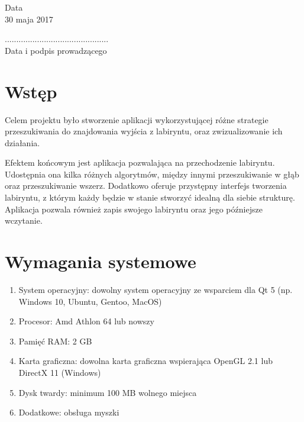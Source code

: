 \documentclass[12pt,a4paper]{article}
\newcommand{\datazajec}{30 maja 2017}
\begin{document}
	\begin{minipage}[t]{0.4\linewidth}
		\centering
		Data \\
		\small \datazajec
	\end{minipage}
	
	\begin{flushright}
		\begin{minipage}[t]{0.5\linewidth}
			\centering
			............................................. \\
			\small \textsf{Data i podpis prowadzącego}
		\end{minipage}
	\end{flushright}
	\pagebreak

	\tableofcontents

	\pagebreak

	
	\section{Wstęp}
	Celem projektu było stworzenie aplikacji wykorzystującej różne
	strategie przeszukiwania do znajdowania wyjścia z labiryntu, oraz
	zwizualizowanie ich działania.
	
	Efektem końcowym jest aplikacja pozwalająca na przechodzenie
	labiryntu. Udostępnia ona kilka różnych algorytmów, między innymi
	przeszukiwanie w głąb oraz przeszukiwanie wszerz. Dodatkowo oferuje
	przystępny interfejs tworzenia labiryntu, z którym każdy będzie w
	stanie stworzyć idealną dla siebie strukturę. Aplikacja pozwala
	również zapis swojego labiryntu oraz jego późniejsze wczytanie.
	
	\section{Wymagania systemowe}
		\begin{enumerate}[label=•]
			\item System operacyjny: dowolny system operacyjny ze 
				wsparciem dla Qt 5 (np. Windows 10, Ubuntu, Gentoo, 
				MacOS)
			\item Procesor: Amd Athlon 64 lub nowszy
			\item Pamięć RAM: 2 GB
			\item Karta graficzna: dowolna karta graficzna wspierająca
				OpenGL 2.1 lub DirectX 11 (Windows)
			\item Dysk twardy: minimum 100 MB wolnego miejsca
			\item Dodatkowe: obsługa myszki
		\end{enumerate}
		
\end{document}

